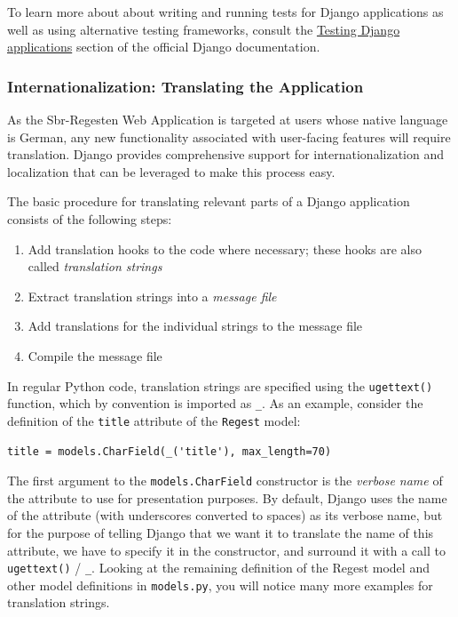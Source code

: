 To learn more about about writing and running tests for Django
applications as well as using alternative testing frameworks, consult
the
\href{https://docs.djangoproject.com/en/1.4/topics/testing/}{Testing
  Django applications} section of the official Django documentation.

\subsubsection{Internationalization: Translating the Application}
\label{sec:translate}

As the Sbr-Regesten Web Application is targeted at users whose native
language is German, any new functionality associated with user-facing
features will require translation. Django provides comprehensive
support for internationalization and localization that can be
leveraged to make this process easy.

The basic procedure for translating relevant parts of a Django
application consists of the following steps:

\begin{enumerate}
\item Add translation hooks to the code where necessary; these hooks
  are also called \emph{translation strings}
\item Extract translation strings into a \emph{message file}
\item Add translations for the individual strings to the message file
\item Compile the message file
\end{enumerate}

In regular Python code, translation strings are specified using the
\texttt{ugettext()} function, which by convention is imported as
\texttt{\_}. As an example, consider the definition of the
\texttt{title} attribute of the \texttt{Regest} model:

\begin{verbatim}
title = models.CharField(_('title'), max_length=70)
\end{verbatim}

The first argument to the \texttt{models.CharField} constructor is the
\emph{verbose name} of the attribute to use for presentation purposes.
By default, Django uses the name of the attribute (with underscores
converted to spaces) as its verbose name, but for the purpose of
telling Django that we want it to translate the name of this
attribute, we have to specify it in the constructor, and surround it
with a call to \texttt{ugettext()} / \texttt{\_}. Looking at the
remaining definition of the Regest model and other model definitions
in \texttt{models.py}, you will notice many more examples for
translation strings.

